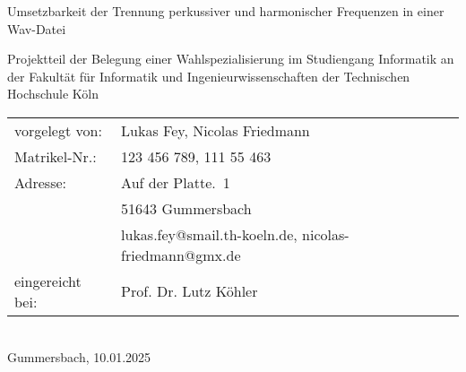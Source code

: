 \begin{titlepage}
%
\sffamily%
%
\begin{center}
\end{center}
%
\vfill
%
\begin{huge}
Umsetzbarkeit der Trennung perkussiver und harmonischer Frequenzen in einer Wav-Datei\\[10mm]
\end{huge}
%
Projektteil der Belegung einer Wahlspezialisierung\newline
im Studiengang Informatik\newline
an der Fakultät für Informatik und Ingenieurwissenschaften\newline
der Technischen Hochschule Köln
%
\vfill
%
\begin{tabular}{@{}ll}
vorgelegt von: & Lukas Fey, Nicolas Friedmann\\
Matrikel-Nr.:  & 123 456 789, 111 55 463\\
Adresse:       & Auf der Platte.~1\\
               & 51643 Gummersbach\\
               & lukas.fey@smail.th-koeln.de, nicolas-friedmann@gmx.de\\[5mm]
eingereicht bei:   & Prof. Dr. Lutz Köhler\\
\end{tabular}	
%
\\[10mm]
%
Gummersbach, 10.01.2025%
%
\rmfamily%
%
\end{titlepage}